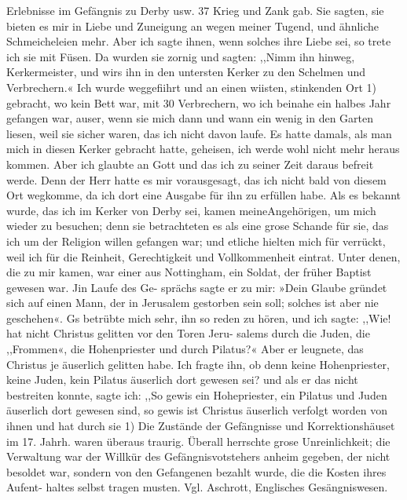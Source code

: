 Erlebnisse im Gefängnis zu Derby usw. 37
Krieg und Zank gab. Sie sagten, sie bieten es mir in Liebe und
Zuneigung an wegen meiner Tugend, und ähnliche Schmeicheleien
mehr. Aber ich sagte ihnen, wenn solches ihre Liebe sei, so trete
ich sie mit Füsen. Da wurden sie zornig und sagten: ,,Nimm
ihn hinweg, Kerkermeister, und wirs ihn in den untersten Kerker
zu den Schelmen und Verbrechern.« Ich wurde weggefiihrt und
an einen wiisten, stinkenden Ort 1) gebracht, wo kein Bett war,
mit 30 Verbrechern, wo ich beinahe ein halbes Jahr gefangen
war, auser, wenn sie mich dann und wann ein wenig in den
Garten liesen, weil sie sicher waren, das ich nicht davon laufe.
Es hatte damals, als man mich in diesen Kerker gebracht hatte,
geheisen, ich werde wohl nicht mehr heraus kommen. Aber ich
glaubte an Gott und das ich zu seiner Zeit daraus befreit werde.
Denn der Herr hatte es mir vorausgesagt, das ich nicht bald
von diesem Ort wegkomme, da ich dort eine Ausgabe für ihn zu
erfüllen habe.
Als es bekannt wurde, das ich im Kerker von Derby sei, kamen
meineAngehörigen, um mich wieder zu besuchen; denn sie betrachteten
es als eine grose Schande für sie, das ich um der Religion
willen gefangen war; und etliche hielten mich für verrückt, weil
ich für die Reinheit, Gerechtigkeit und Vollkommenheit eintrat.
Unter denen, die zu mir kamen, war einer aus Nottingham,
ein Soldat, der früher Baptist gewesen war. Jin Laufe des Ge-
sprächs sagte er zu mir: »Dein Glaube gründet sich auf einen
Mann, der in Jerusalem gestorben sein soll; solches ist aber nie
geschehen«. Gs betrübte mich sehr, ihn so reden zu hören, und
ich sagte: ,,Wie! hat nicht Christus gelitten vor den Toren Jeru-
salems durch die Juden, die ,,Frommen«, die Hohenpriester und
durch Pilatus?« Aber er leugnete, das Christus je äuserlich
gelitten habe. Ich fragte ihn, ob denn keine Hohenpriester, keine
Juden, kein Pilatus äuserlich dort gewesen sei? und als er das
nicht bestreiten konnte, sagte ich: ,,So gewis ein Hohepriester,
ein Pilatus und Juden äuserlich dort gewesen sind, so gewis ist
Christus äuserlich verfolgt worden von ihnen und hat durch sie
1) Die Zustände der Gefängnisse und Korrektionshäuset im 17. Jahrh.
waren überaus traurig. Überall herrschte grose Unreinlichkeit; die Verwaltung
war der Willkür des Gefängnisvotstehers anheim gegeben, der nicht besoldet
war, sondern von den Gefangenen bezahlt wurde, die die Kosten ihres Aufent-
haltes selbst tragen musten. Vgl. Aschrott, Englisches Gesängniswesen.


